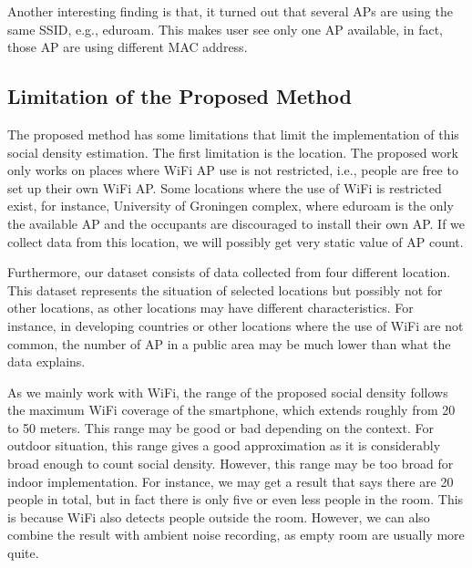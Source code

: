 	Another interesting finding is that, it turned out that several \ac{AP}s are using the same \ac{SSID}, e.g., eduroam. This makes user see only one \ac{AP} available, in fact, those \ac{AP} are using different \ac{MAC} address.
	

	







	\subsection{Limitation of the Proposed Method} %
	\label{sub:limitation_of_the_present_study}
	The proposed method has some limitations that limit the implementation of this social density estimation.
	The first limitation is the location. The proposed work only works on places where WiFi \ac{AP} use is not restricted, i.e., people are free to set up their own WiFi AP. Some locations where the use of WiFi is restricted exist, for instance, University of Groningen complex, where eduroam is the only the available AP and the occupants are discouraged to install their own AP. If we collect data from this location, we will possibly get very static value of \ac{AP} count.

	Furthermore, our dataset consists of data collected from four different location. This dataset represents the situation of selected locations but possibly not for other locations, as other locations may have different characteristics. For instance, in developing countries or other locations where the use of WiFi are not common, the number of \ac{AP} in a public area may be much lower than what the data explains.

	As we mainly work with WiFi, the range of the proposed social density follows the maximum WiFi coverage of the smartphone, which extends roughly from 20 to 50 meters. This range may be good or bad depending on the context. For outdoor situation, this range gives a good approximation as it is considerably broad enough to count social density. However, this range may be too broad for indoor implementation. For instance, we may get a result that says there are 20 people in total, but in fact there is only five or even less people in the room. This is because WiFi also detects people outside the room. However, we can also combine the result with ambient noise recording, as empty room are usually more quite.


